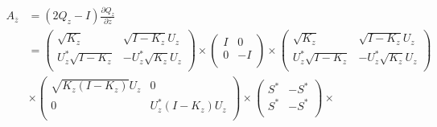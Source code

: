 \documentclass{amsart}
\begin{document}
\begin{align*}
A_{\overline{z}} &= (2Q_{z} - I)\frac{\partial Q_{z}}{\partial \overline{z}} \\
&= \left(
                                       \begin{array}{cc}
                                         \sqrt{K_z} & \sqrt{I- K_z}U_z \\
                                         U^{*}_z \sqrt{I- K_z} & -U^{*}_{z}\sqrt{K_{z}}U_{z} \\
                                       \end{array}
                                     \right) \times
\left(
                                       \begin{array}{cc}
                                        I & 0 \\
                                        0&-I\\
                                       \end{array}
                                     \right) \times
\left(
                                       \begin{array}{cc}
                                         \sqrt{K_z} & \sqrt{I- K_z}U_z \\
                                         U^{*}_z \sqrt{I- K_z} & -U^{*}_{z}\sqrt{K_{z}}U_{z} \\
                                       \end{array}
                                     \right) \\
&\times\left(
                                        \begin{array}{cc}
                                          \sqrt{K_{z}(I - K_z)}U_z & 0 \\
                                          0 & U^{*}_{z}(I - K_z)U_z \\
                                        \end{array}
                                      \right)\times
                                      \left(
                                        \begin{array}{cc}
                                          S^{*} & -S^{*} \\
                                          S^{*} & -S^{*} \\
                                        \end{array}
                                      \right) \times

\end{align*}
\end{document}
